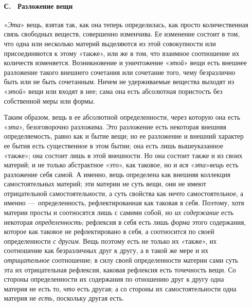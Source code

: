 \paragraph[С. \ Разложение вещи]{С. \ Разложение вещи}
«{\em Эта}» вещь, взятая
так, как она теперь определилась, как просто количественная связь свободных
веществ, совершенно изменчива. Ее изменение состоит в том, что одна или
несколько материй выделяются из этой совокупности или присоединяются к
этому «также», или же в том, что взаимное соотношение их количеств
изменяется. Возникновение и уничтожение «{\em этой}»
вещи есть внешнее разложение такого внешнего сочетания или сочетание того,
чему безразлично быть или не быть сочетанным. Ничем не удерживаемые
вещества выходят из «{\em этой}» вещи или входят в нее;
сама она есть абсолютная пористость без собственной меры или формы.

Таким образом, вещь в ее абсолютной определенности, через которую она есть
«{\em эта}», безоговорочно разложима. Это разложение
есть некоторая внешняя определяемость, равно как и бытие вещи; но ее
разложение и внешний характер ее бытия есть существенное в этом бытии; она
есть лишь вышеуказанное «также»; она состоит лишь в этой внешности. Но она
состоит также и из своих материй; и не только абстрактное «это», как
таковое, но и {\em вся}
«{\em эта}»{\em  вещь} есть
разложение себя самой. А именно, вещь определена как внешняя коллекция
самостоятельных материй; эти материи не суть вещи, они не имеют
отрицательной самостоятельности, а суть свойства как нечто самостоятельное,
а именно —~определенность, рефлектированная как таковая в себя. Поэтому,
хотя материи просты и соотносятся лишь с самими собой, но
{\em их содержание} есть некоторая
{\em определенность}; рефлексия в себя есть лишь
{\em форма} этого содержания, которое как таковое не
рефлектировано в себя, а соотносится по своей определенности
{\em с другим}. Вещь поэтому есть не только их «также»,
их соотношение как безразличных друг к другу, а в такой же мере и их
{\em отрицательное} соотношение; в силу своей
определенности материи сами суть эта их отрицательная рефлексия, каковая
рефлексия есть точечность вещи. Со стороны определенности их содержания по
отношению друг к другу одна материя не есть то,
{\em что} есть другая; а со стороны их
самостоятельности одна материя не {\em есть}, поскольку
другая есть.

